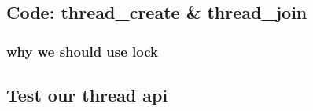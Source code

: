 \subsection{Code: thread\_create \& thread\_join}




\subsubsection{why we should use lock}

\subsection{Test our thread api}